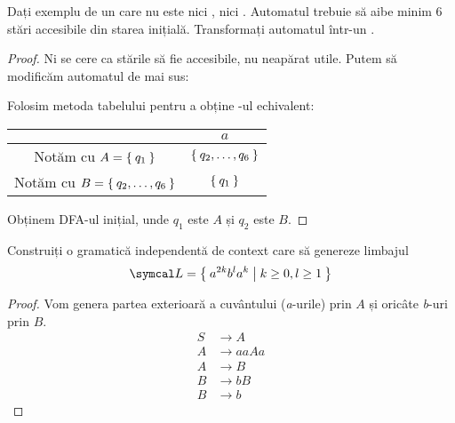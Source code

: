 \begin{exercise}
    Dați exemplu de un \nfa care nu este nici \lnfa, nici \dfa. Automatul trebuie să aibe minim 6 stări accesibile din starea inițială. Transformați automatul într-un \dfa.
\end{exercise}
\begin{proof}
    Ni se cere ca stările să fie accesibile, nu neapărat utile. Putem să modificăm automatul de mai sus:
    \begin{figure}[H]
        \centering
    \end{figure}

    Folosim metoda tabelului pentru a obține \dfa-ul echivalent:
    \begin{center}
        \begin{tabular}{c|c}
                                                   & \(a\)                     \\
            \hline
            Notăm cu \(A = \Set{q_1}\)             & \(\Set{q_2, \dots, q_6}\) \\
            \hline
            Notăm cu \(B = \Set{q_2, \dots, q_6}\) & \(\Set{q_1}\)
        \end{tabular}
    \end{center}
    Obținem DFA-ul inițial, unde \(q_1\) este \(A\) și \(q_2\) este \(B\).
\end{proof}

\begin{exercise}
    Construiți o gramatică independentă de context care să genereze limbajul
    \[\limbaj = \Set{ a^{2k} b^l a^k | k \geq 0, l \geq 1 }\]
\end{exercise}
\begin{proof}
    Vom genera partea exterioară a cuvântului (\textit{a}-urile) prin \(A\) și oricâte \textit{b}-uri prin \(B\).
    \begin{align*}
        S & \rightarrow A    \\
        A & \rightarrow aaAa \\
        A & \rightarrow B    \\
        B & \rightarrow bB   \\
        B & \rightarrow b
    \end{align*}
\end{proof}

